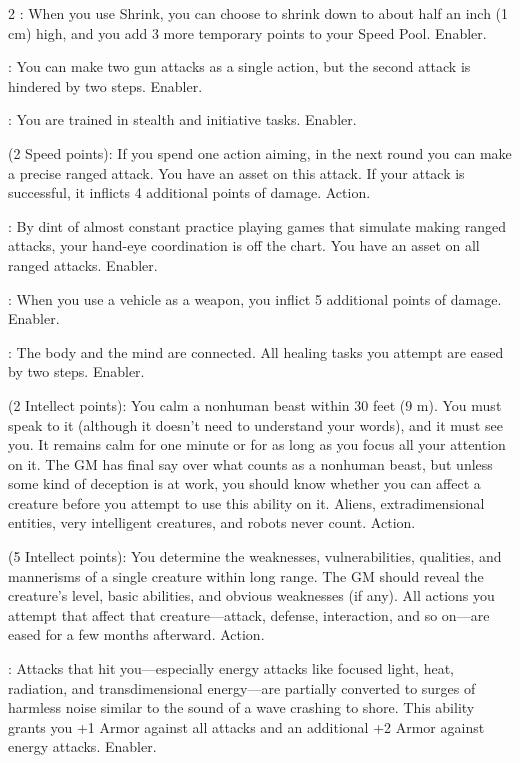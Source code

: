 \begin{multicols}{2}
: When you use Shrink, you can choose to shrink down to about half an inch (1 cm) high, and you add 3 more temporary points to your Speed Pool. Enabler.

: You can make two gun attacks as a single action, but the second attack is hindered by two steps. Enabler. 
 
: You are trained in stealth and initiative tasks. Enabler. 
 
 (2 Speed points): If you spend one action aiming, in the next round you can make a precise ranged attack. You have an asset on this attack. If your attack is successful, it inflicts 4 additional points of damage. Action. 
 
: By dint of almost constant practice playing games that simulate making ranged attacks, your hand-eye coordination is off the chart. You have an asset on all ranged attacks. Enabler. 
 
: When you use a vehicle as a weapon, you inflict 5 additional points of damage. Enabler. 
 
: The body and the mind are connected. All healing tasks you attempt are eased by two steps. Enabler.
 
 (2 Intellect points): You calm a nonhuman beast within 30 feet (9 m). You must speak to it (although it doesn’t need to understand your words), and it must see you. It remains calm for one minute or for as long as you focus all your attention on it. The GM has final say over what counts as a nonhuman beast, but unless some kind of deception is at work, you should know whether you can affect a creature before you attempt to use this ability on it. Aliens, extradimensional entities, very intelligent creatures, and robots never count. Action. 
 
 (5 Intellect points): You determine the weaknesses, vulnerabilities, qualities, and mannerisms of a single creature within long range. The GM should reveal the creature’s level, basic abilities, and obvious weaknesses (if any). All actions you attempt that affect that creature—attack, defense, interaction, and so on—are eased for a few months afterward. Action. 
 
: Attacks that hit you—especially energy attacks like focused light, heat, radiation, and transdimensional energy—are partially converted to surges of harmless noise similar to the sound of a wave crashing to shore. This ability grants you +1 Armor against all attacks and an additional +2 Armor against energy attacks. Enabler. 
 

\end{multicols}
